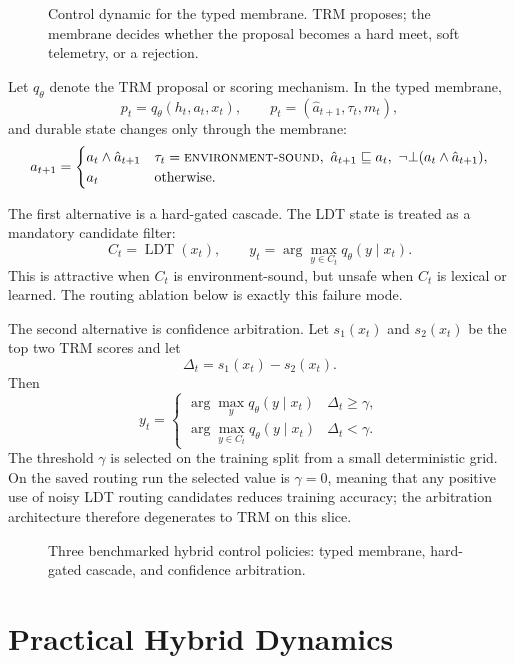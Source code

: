 \documentclass[11pt]{article}
\newcommand{\envsound}{\textsc{environment-sound}}
\begin{document}
\begin{figure}[t]
\centering

\caption{Control dynamic for the typed membrane. TRM proposes; the membrane decides whether the proposal becomes a hard meet, soft telemetry, or a rejection.}
\label{fig:control-dynamics}
\end{figure}

Let $q_\theta$ denote the TRM proposal or scoring mechanism. In the typed membrane,
\[
  p_t = q_\theta(h_t,a_t,x_t), \qquad
  p_t = (\hat a_{t+1},\tau_t,m_t),
\]
and durable state changes only through the membrane:
\[
a_{t+1} =
\begin{cases}
a_t \wedge \hat a_{t+1} & \tau_t=\envsound,\ \hat a_{t+1}\sqsubseteq a_t,\ \neg\bot(a_t\wedge\hat a_{t+1}),\\
a_t & \text{otherwise.}
\end{cases}
\]

The first alternative is a hard-gated cascade. The LDT state is treated as a mandatory candidate filter:
\[
  C_t = \operatorname{LDT}(x_t), \qquad
  y_t = \arg\max_{y\in C_t} q_\theta(y\mid x_t).
\]
This is attractive when $C_t$ is environment-sound, but unsafe when $C_t$ is lexical or learned. The routing ablation below is exactly this failure mode.

The second alternative is confidence arbitration. Let $s_1(x_t)$ and $s_2(x_t)$ be the top two TRM scores and let
\[
  \Delta_t=s_1(x_t)-s_2(x_t).
\]
Then
\[
y_t =
\begin{cases}
\arg\max_y q_\theta(y\mid x_t) & \Delta_t\ge\gamma,\\
\arg\max_{y\in C_t} q_\theta(y\mid x_t) & \Delta_t<\gamma.
\end{cases}
\]
The threshold $\gamma$ is selected on the training split from a small deterministic grid. On the saved routing run the selected value is $\gamma=0$, meaning that any positive use of noisy LDT routing candidates reduces training accuracy; the arbitration architecture therefore degenerates to TRM on this slice.

\begin{figure}[t]
\centering

\caption{Three benchmarked hybrid control policies: typed membrane, hard-gated cascade, and confidence arbitration.}
\label{fig:architecture-comparison}
\end{figure}

\section{Practical Hybrid Dynamics}
\end{document}
